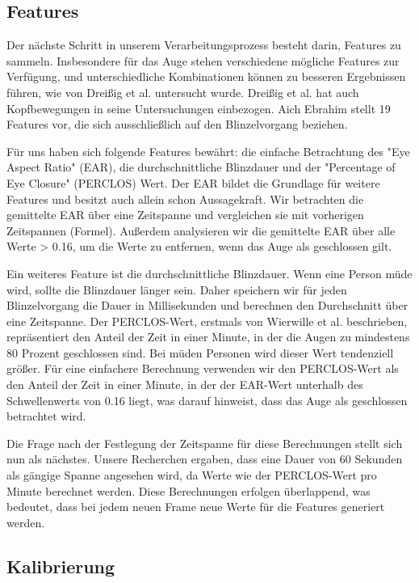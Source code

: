 \subsection{Features}
\label{sec:features}

Der nächste Schritt in unserem Verarbeitungsprozess besteht darin, Features zu sammeln. Insbesondere für das Auge stehen verschiedene mögliche Features zur Verfügung, und unterschiedliche Kombinationen können zu besseren Ergebnissen führen, wie von Dreißig et al. \cite{DREI} untersucht wurde. Dreißig et al. hat auch Kopfbewegungen in seine Untersuchungen einbezogen. Aich Ebrahim \cite{EB16} stellt 19 Features vor, die sich ausschließlich auf den Blinzelvorgang beziehen.

Für uns haben sich folgende Features bewährt: die einfache Betrachtung des "Eye Aspect Ratio" (EAR), die durchschnittliche Blinzdauer und der "Percentage of Eye Closure" (PERCLOS) Wert. Der EAR bildet die Grundlage für weitere Features und besitzt auch allein schon Aussagekraft. Wir betrachten die gemittelte EAR über eine Zeitspanne und vergleichen sie mit vorherigen Zeitspannen (Formel). Außerdem analysieren wir die gemittelte EAR über alle Werte > 0.16, um die Werte zu entfernen, wenn das Auge als geschlossen gilt.

Ein weiteres Feature ist die durchschnittliche Blinzdauer. Wenn eine Person müde wird, sollte die Blinzdauer länger sein. Daher speichern wir für jeden Blinzelvorgang die Dauer in Millisekunden und berechnen den Durchschnitt über eine Zeitspanne.
Der PERCLOS-Wert, erstmals von Wierwille et al. \cite{WI94} beschrieben, repräsentiert den Anteil der Zeit in einer Minute, in der die Augen zu mindestens 80 Prozent geschlossen sind. Bei müden Personen wird dieser Wert tendenziell größer. Für eine einfachere Berechnung verwenden wir den PERCLOS-Wert als den Anteil der Zeit in einer Minute, in der der EAR-Wert unterhalb des Schwellenwerts von 0.16 liegt, was darauf hinweist, dass das Auge als geschlossen betrachtet wird.

Die Frage nach der Festlegung der Zeitspanne für diese Berechnungen stellt sich nun als nächstes. Unsere Recherchen ergaben, dass eine Dauer von 60 Sekunden als gängige Spanne angesehen wird, da Werte wie der PERCLOS-Wert pro Minute berechnet werden. Diese Berechnungen erfolgen überlappend, was bedeutet, dass bei jedem neuen Frame neue Werte für die Features generiert werden.

\subsection{Kalibrierung}
\label{sec:calibration}

